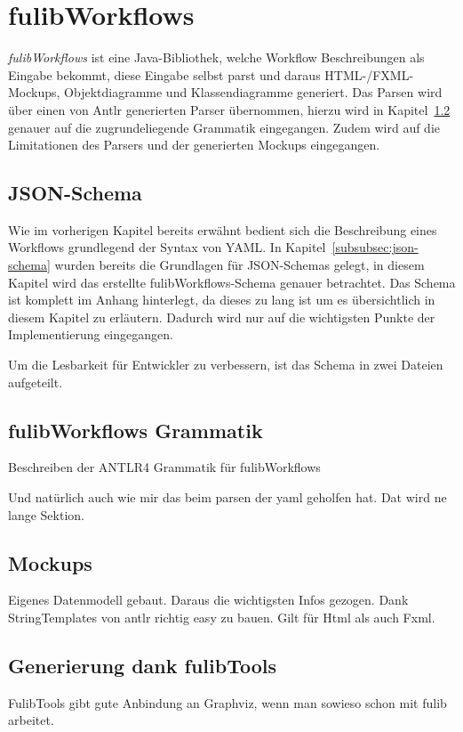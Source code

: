 \section{fulibWorkflows}\label{sec:fulibworkflows2}
\textit{fulibWorkflows} ist eine Java-Bibliothek, welche Workflow Beschreibungen als Eingabe bekommt, diese Eingabe
selbst parst und daraus HTML-/FXML-Mockups, Objektdiagramme und Klassendiagramme generiert.
Das Parsen wird über einen von Antlr generierten Parser übernommen, hierzu wird in Kapitel~\ref{subsec:fulibworkflows-grammatik} genauer auf
die zugrundeliegende Grammatik eingegangen.
Zudem wird auf die Limitationen des Parsers und der generierten Mockups eingegangen.



\subsection{JSON-Schema}\label{subsec:schema}
Wie im vorherigen Kapitel bereits erwähnt bedient sich die Beschreibung eines Workflows grundlegend der Syntax von \ac*{YAML}.
In Kapitel~\ref{subsubsec:json-schema} wurden bereits die Grundlagen für JSON-Schemas gelegt, in diesem Kapitel wird das erstellte
fulibWorkflows-Schema genauer betrachtet.
Das Schema ist komplett im Anhang hinterlegt, da dieses zu lang ist um es übersichtlich in diesem Kapitel zu erläutern.
Dadurch wird nur auf die wichtigsten Punkte der Implementierung eingegangen.



Um die Lesbarkeit für Entwickler zu verbessern, ist das Schema in zwei Dateien aufgeteilt.


\subsection{fulibWorkflows Grammatik}\label{subsec:fulibworkflows-grammatik}
Beschreiben der ANTLR4 Grammatik für fulibWorkflows

Und natürlich auch wie mir das beim parsen der yaml geholfen hat.
Dat wird ne lange Sektion.

\subsection{Mockups}\label{subsec:mockups}
Eigenes Datenmodell gebaut.
Daraus die wichtigsten Infos gezogen.
Dank StringTemplates von antlr richtig easy zu bauen.
Gilt für Html als auch Fxml.

\subsection{Generierung dank fulibTools}\label{subsec:generierung-dank-fulibtools}
FulibTools gibt gute Anbindung an Graphviz, wenn man sowieso schon mit fulib arbeitet.
